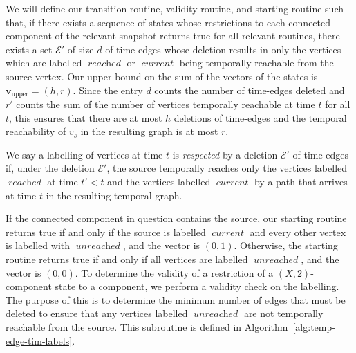 \documentclass[a4paper,UKenglish,cleveref, autoref, thm-restate]{lipics-v2021} %
\DeclareMathOperator{\reached}{\textit{reached}}
\DeclareMathOperator{\unreached}{\textit{unreached}}
\DeclareMathOperator{\current}{\textit{current}}
\begin{document}
\begin{toappendix}

We will define our transition routine, validity routine, and starting routine such that, if there exists a sequence of states whose restrictions to each connected component of the relevant snapshot returns true for all relevant routines, there exists a set $\mathcal{E}'$ of size $d$ of time-edges whose deletion results in only the vertices which are labelled $\reached$ or $\current$ being temporally reachable from the source vertex. Our upper bound on the sum of the vectors of the states is $\textbf{v}_{\text{upper}}=(h, r)$. Since the entry $d$ counts the number of time-edges deleted and $r'$ counts the sum of the number of vertices temporally reachable at time $t$ for all $t$, this ensures that there are at most $h$ deletions of time-edges and the temporal reachability of $v_s$ in the resulting graph is at most $r$.

We say a labelling of vertices at time $t$ is \emph{respected} by a deletion $\mathcal{E}'$ of time-edges if, under the deletion $\mathcal{E}'$, the source temporally reaches only the vertices labelled $\reached$ at time $t'<t$ and the vertices labelled $\current$ by a path that arrives at time $t$ in the resulting temporal graph.

If the connected component in question contains the source, our starting routine returns true if and only if the source is labelled $\current$ and every other vertex is labelled with $\unreached$, and the vector is $(0,1)$. Otherwise, the starting routine returns true if and only if all vertices are labelled $\unreached$, and the vector is $(0,0)$. To determine the validity of a restriction of a $(X,2)$-component state to a component, we perform a validity check on the labelling. The purpose of this is to determine the minimum number of edges that must be deleted to ensure that any vertices labelled $\unreached$ are not temporally reachable from the source. This subroutine is defined in Algorithm~\ref{alg:temp-edge-tim-labels}.


\end{toappendix}
\end{document}
